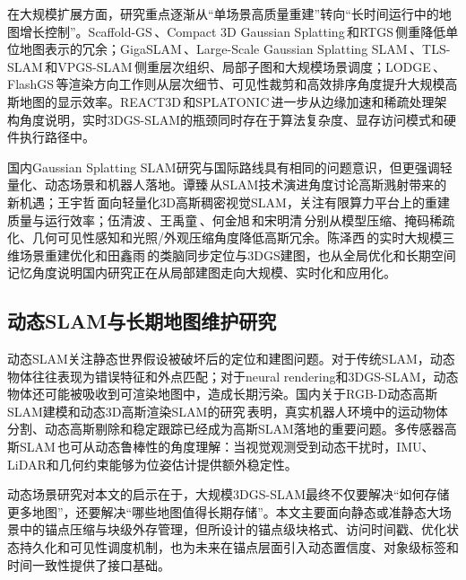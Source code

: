 在大规模扩展方面，研究重点逐渐从“单场景高质量重建”转向“长时间运行中的地图增长控制”。Scaffold-GS\,\cite{lu2024scaffoldgs}、Compact 3D Gaussian Splatting\,\cite{deng2025compact}和RTGS\,\cite{li2025rtgs}侧重降低单位地图表示的冗余；GigaSLAM\,\cite{deng2025gigaslam}、Large-Scale Gaussian Splatting SLAM\,\cite{xin2025largescale}、TLS-SLAM\,\cite{cheng2025tlsslam}和VPGS-SLAM\,\cite{deng2026vpgsslam}侧重层次组织、局部子图和大规模场景调度；LODGE\,\cite{kulhanek2025lodge}、FlashGS\,\cite{feng2025flashgs}等渲染方向工作则从层次细节、可见性裁剪和高效排序角度提升大规模高斯地图的显示效率。REACT3D\,\cite{wang2025react3d}和SPLATONIC\,\cite{huang2026splatonic}进一步从边缘加速和稀疏处理架构角度说明，实时3DGS-SLAM的瓶颈同时存在于算法复杂度、显存访问模式和硬件执行路径中。

国内Gaussian Splatting SLAM研究与国际路线具有相同的问题意识，但更强调轻量化、动态场景和机器人落地。谭臻\,\cite{tan2025slamopportunity}从SLAM技术演进角度讨论高斯溅射带来的新机遇；王宇哲\,\cite{wangyuzhe2025lightweight}面向轻量化3D高斯稠密视觉SLAM，关注有限算力平台上的重建质量与运行效率；伍清波\,\cite{wuqingbo2025compression}、王禹童\,\cite{wangyutong2025maskcompression}、何金旭\,\cite{hejinxu2025compact3dgs}和宋明清\,\cite{songmingqing2025probecompression}分别从模型压缩、掩码稀疏化、几何可见性感知和光照/外观压缩角度降低高斯冗余。陈泽西\,\cite{chenzexi2025rertg}的实时大规模三维场景重建优化和田鑫雨\,\cite{tianxinyu2025brainslam}的类脑同步定位与3DGS建图，也从全局优化和长期空间记忆角度说明国内研究正在从局部建图走向大规模、实时化和应用化。

\subsection{动态SLAM与长期地图维护研究}

动态SLAM关注静态世界假设被破坏后的定位和建图问题。对于传统SLAM，动态物体往往表现为错误特征和外点匹配；对于neural rendering和3DGS-SLAM，动态物体还可能被吸收到可渲染地图中，造成长期污染。国内关于RGB-D动态高斯SLAM建模和动态3D高斯渲染SLAM的研究\,\cite{zhanglanxin2025dynamicrgbd,zhangbin2025dynamic3dgs}表明，真实机器人环境中的运动物体分割、动态高斯剔除和稳定跟踪已经成为高斯SLAM落地的重要问题。多传感器高斯SLAM\,\cite{hong2025gslivo,zhu2026vigsslam,che2026denseimu}也可从动态鲁棒性的角度理解：当视觉观测受到动态干扰时，IMU、LiDAR和几何约束能够为位姿估计提供额外稳定性。

动态场景研究对本文的启示在于，大规模3DGS-SLAM最终不仅要解决“如何存储更多地图”，还要解决“哪些地图值得长期存储”。本文主要面向静态或准静态大场景中的锚点压缩与块级外存管理，但所设计的锚点级块格式、访问时间戳、优化状态持久化和可见性调度机制，也为未来在锚点层面引入动态置信度、对象级标签和时间一致性提供了接口基础。

